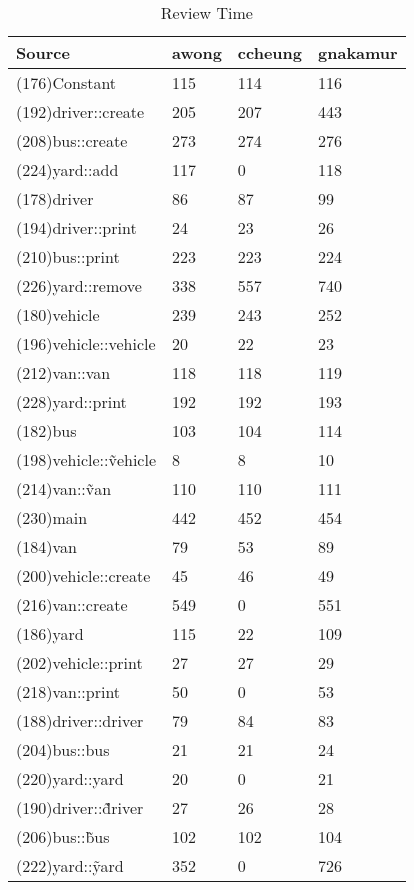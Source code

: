 \begin{table}[hb]
\begin{center}
\begin{tabular}{|l|l|l|l|}
\hline
Source & awong & ccheung & gnakamur\\
\hline
(176)Constant & 115 & 114 & 116\\
(192)driver::create & 205 & 207 & 443\\
(208)bus::create & 273 & 274 & 276\\
(224)yard::add & 117 & 0 & 118\\
(178)driver & 86 & 87 & 99\\
(194)driver::print & 24 & 23 & 26\\
(210)bus::print & 223 & 223 & 224\\
(226)yard::remove & 338 & 557 & 740\\
(180)vehicle & 239 & 243 & 252\\
(196)vehicle::vehicle & 20 & 22 & 23\\
(212)van::van & 118 & 118 & 119\\
(228)yard::print & 192 & 192 & 193\\
(182)bus & 103 & 104 & 114\\
(198)vehicle::\~vehicle & 8 & 8 & 10\\
(214)van::\~van & 110 & 110 & 111\\
(230)main & 442 & 452 & 454\\
(184)van & 79 & 53 & 89\\
(200)vehicle::create & 45 & 46 & 49\\
(216)van::create & 549 & 0 & 551\\
(186)yard & 115 & 22 & 109\\
(202)vehicle::print & 27 & 27 & 29\\
(218)van::print & 50 & 0 & 53\\
(188)driver::driver & 79 & 84 & 83\\
(204)bus::bus & 21 & 21 & 24\\
(220)yard::yard & 20 & 0 & 21\\
(190)driver::\~driver & 27 & 26 & 28\\
(206)bus::\~bus & 102 & 102 & 104\\
(222)yard::\~yard & 352 & 0 & 726\\
\hline
\end{tabular}
\end{center}
\caption{Review Time}
\end{table}


